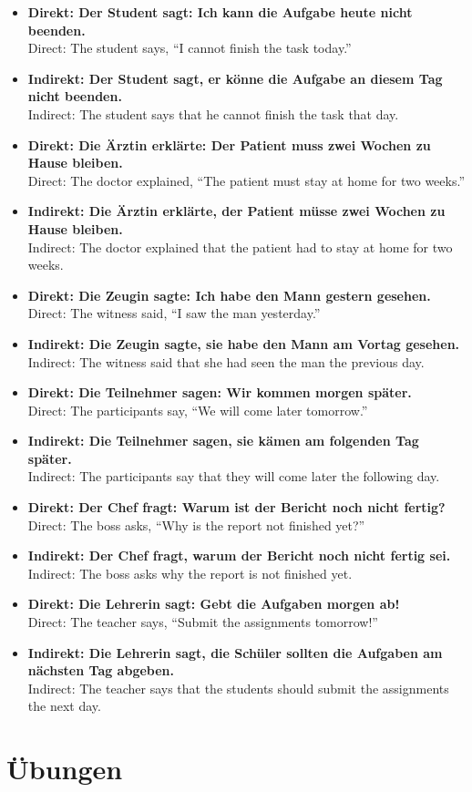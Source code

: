 \documentclass[a4paper,11pt]{article}
\newcommand{\ExampleItem}[2]{\item \textbf{#1}\\{\small\color{SoftGray}#2}}
\begin{document}
        \begin{exbox}
            \begin{itemize}
                \ExampleItem{Direkt: Der Student sagt: \glqq Ich kann die Aufgabe heute nicht beenden.\grqq}{Direct: The student says, ``I cannot finish the task today.''}
                \ExampleItem{Indirekt: Der Student sagt, er könne die Aufgabe an diesem Tag nicht beenden.}{Indirect: The student says that he cannot finish the task that day.}

                \ExampleItem{Direkt: Die Ärztin erklärte: \glqq Der Patient muss zwei Wochen zu Hause bleiben.\grqq}{Direct: The doctor explained, ``The patient must stay at home for two weeks.''}
                \ExampleItem{Indirekt: Die Ärztin erklärte, der Patient müsse zwei Wochen zu Hause bleiben.}{Indirect: The doctor explained that the patient had to stay at home for two weeks.}

                \ExampleItem{Direkt: Die Zeugin sagte: \glqq Ich habe den Mann gestern gesehen.\grqq}{Direct: The witness said, ``I saw the man yesterday.''}
                \ExampleItem{Indirekt: Die Zeugin sagte, sie habe den Mann am Vortag gesehen.}{Indirect: The witness said that she had seen the man the previous day.}

                \ExampleItem{Direkt: Die Teilnehmer sagen: \glqq Wir kommen morgen später.\grqq}{Direct: The participants say, ``We will come later tomorrow.''}
                \ExampleItem{Indirekt: Die Teilnehmer sagen, sie kämen am folgenden Tag später.}{Indirect: The participants say that they will come later the following day.}

                \ExampleItem{Direkt: Der Chef fragt: \glqq Warum ist der Bericht noch nicht fertig?\grqq}{Direct: The boss asks, ``Why is the report not finished yet?''}
                \ExampleItem{Indirekt: Der Chef fragt, warum der Bericht noch nicht fertig sei.}{Indirect: The boss asks why the report is not finished yet.}

                \ExampleItem{Direkt: Die Lehrerin sagt: \glqq Gebt die Aufgaben morgen ab!\grqq}{Direct: The teacher says, ``Submit the assignments tomorrow!''}
                \ExampleItem{Indirekt: Die Lehrerin sagt, die Schüler sollten die Aufgaben am nächsten Tag abgeben.}{Indirect: The teacher says that the students should submit the assignments the next day.}
            \end{itemize}
        \end{exbox}


    \section{Übungen}
\end{document}
